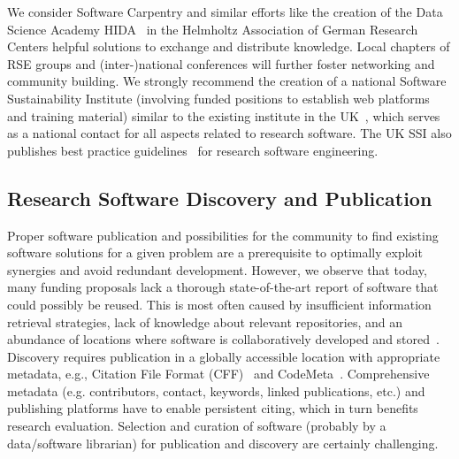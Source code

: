 \documentclass[a4paper,num-refs,numbers,sort&compress]{de-rse}
\begin{document}
We consider Software Carpentry and similar efforts like the creation of the Data Science Academy HIDA~\cite{HIDA} in the Helmholtz Association of German Research Centers helpful solutions to exchange and distribute knowledge. Local chapters of RSE groups and (inter-)national conferences will further foster networking and community building. We strongly recommend the creation of a national Software Sustainability Institute (involving funded positions to establish web platforms and training material) similar to the existing institute in the UK~\cite{UKSoftwareSustainabilityInstitute}, which serves as a national contact for all aspects related to research software. The UK SSI also publishes best practice guidelines~\cite{SoftwareSystemsDevelopmentLifeCycle_SDLC} for research software engineering.

\subsection{Research Software Discovery and Publication}
Proper software publication and possibilities for the community to find existing software solutions for a given problem are a prerequisite to optimally exploit synergies and avoid redundant development. However, we observe that today, many funding proposals lack a thorough state-of-the-art report of software that could possibly be reused. This is most often caused by insufficient information retrieval strategies, lack of knowledge about relevant repositories, and an abundance of locations where software is collaboratively developed and stored~\cite{Struck2018}. Discovery requires publication in a globally accessible location with appropriate metadata, e.g., Citation File Format (CFF)~\cite{CFF} and CodeMeta~\cite{CodeMeta}. Comprehensive metadata (e.g. contributors, contact, keywords, linked publications, etc.) and publishing platforms have to enable persistent citing, which in turn benefits research evaluation. Selection and curation of software (probably by a data/software librarian) for publication and discovery are certainly challenging.
\end{document}
